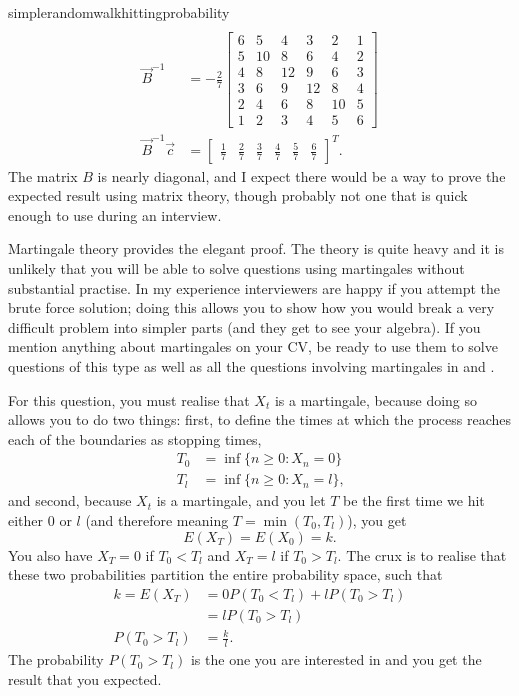 \begin{answer}{simplerandomwalkhittingprobability}
\begin{align*}
\\
\vec{B}^{-1} &=
-
\frac{2}{7}
\left[\begin{matrix}6 & 5 & 4 & 3 & 2 & 1\\5 & 10 & 8 & 6 & 4 & 2\\4 & 8 & 12 & 9 & 6 & 3\\3 & 6 & 9 & 12 & 8 & 4\\2 & 4 & 6 & 8 & 10 & 5\\1 & 2 & 3 & 4 & 5 & 6\end{matrix}\right]
\\
\vec{B}^{-1}\vec{c}
&=
\left[\begin{matrix}\frac{1}{7} & \frac{2}{7} & \frac{3}{7} & \frac{4}{7} & \frac{5}{7} & \frac{6}{7}\end{matrix}\right]^{T}
\text{.}
\end{align*}
The matrix $B$ is nearly diagonal, and I expect there would be a way to prove the expected result using matrix theory, though probably not one that is quick enough to use during an interview.

Martingale theory provides the elegant proof.
The theory is quite heavy and it is unlikely that you will be able to solve questions using martingales without substantial practise.
In my experience interviewers are happy if you attempt the brute force solution; doing this allows you to show how you would break a very difficult problem into simpler parts (and they get to see your algebra).
If you mention anything about martingales on your CV, be ready to use them to solve questions of this type as well as all the questions involving martingales in \citet{JoshiQA} and \citet{HeardOnTheStreet}.

For this question, you must realise that $X_t$ is a martingale, because doing so allows you to do two things: first, to define the times at which the process reaches each of the boundaries as stopping times,
\begin{align*}
  T_0 &= \inf\{ n \geq 0: X_n = 0\} \\
  T_l &= \inf\{ n \geq 0: X_n = l\}
  \text{,}
\end{align*}
and second, because $X_t$ is a martingale, and you let $T$ be the first time we hit either $0$ or $l$ (and therefore meaning $T = \min(T_0 , T_l)$), you get
\[
E(X_T) =  E(X_0) = k
\text{.}
\]
You also have
$X_T=0$ if $T_0 < T_l$
and
$X_T=l$ if $T_0 > T_l$.
The crux is to realise that these two probabilities partition the entire probability space, such that
\begin{align*}
k = E(X_T) &=  0 P(T_0 < T_l) + l P(T_0 > T_l) \\
           &=  l P(T_0 > T_l)  \\
P(T_0 > T_l) &= \frac{k}{l}
\text{.}
\end{align*}
The probability $P(T_0 > T_l)$ is the one you are interested in and you get the result that you expected.
\end{answer}
